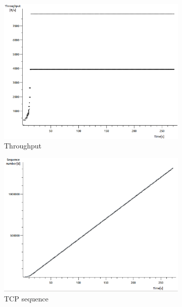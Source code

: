 \documentclass[conference,a4paper]{../../sty/IEEEtran}
\begin{document}
\begin{figure}
 \centering
 \begin{subfigure}[b]{0.2\textwidth}
  \includegraphics[width=\textwidth]{s7-3_th}
  \caption{Throughput}
 \end{subfigure}
 \begin{subfigure}[b]{0.2\textwidth}
  \includegraphics[width=\textwidth]{s7-3_seq}
  \caption{TCP sequence}
 \end{subfigure}
 \begin{subfigure}[b]{0.2\textwidth}

\end{subfigure}
\end{figure}
\end{document}
